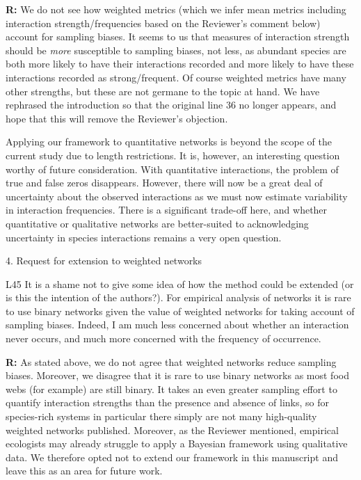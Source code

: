 \documentclass[12pt]{letter}
\newenvironment{refquote}{\bigskip \begin{it}}{\end{it}\smallskip}
\begin{document}
		\textbf{R:} We do not see how weighted metrics (which we infer mean metrics including interaction strength/frequencies based on the Reviewer's comment below) account for sampling biases. It seems to us that measures of interaction strength should be \emph{more} susceptible to sampling biases, not less, as abundant species are both more likely to have their interactions recorded and more likely to have these interactions recorded as strong/frequent. Of course weighted metrics have many other strengths, but these are not germane to the topic at hand. We have rephrased the introduction so that the original line 36 no longer appears, and hope that this will remove the Reviewer's objection.


		Applying our framework to quantitative networks is beyond the scope of the current study due to length restrictions. It is, however, an interesting question worthy of future consideration. With quantitative interactions, the problem of true and false zeros disappears. However, there will now be a great deal of uncertainty about the observed interactions as we must now estimate variability in interaction frequencies. There is a significant trade-off here, and whether quantitative or qualitative networks are better-suited to acknowledging uncertainty in species interactions remains a very open question.


	4. Request for extension to weighted networks


		\begin{refquote}
		L45 It is a shame not to give some idea of how the method could be extended (or is this the intention of the authors?). For empirical analysis of networks it is rare to use binary networks given the value of weighted networks for taking account of sampling biases. Indeed, I am much less concerned about whether an interaction never occurs, and much more concerned with the frequency of occurrence.
		\end{refquote}


		\textbf{R:} As stated above, we do not agree that weighted networks reduce sampling biases. Moreover, we disagree that it is rare to use binary networks as most food webs (for example) are still binary. It takes an even greater sampling effort to quantify interaction strengths than the presence and absence of links, so for species-rich systems in particular there simply are not many high-quality weighted networks published. Moreover, as the Reviewer mentioned, empirical ecologists may already struggle to apply a Bayesian framework using qualitative data. We therefore opted not to extend our framework in this manuscript and leave this as an area for future work.
\end{document}

